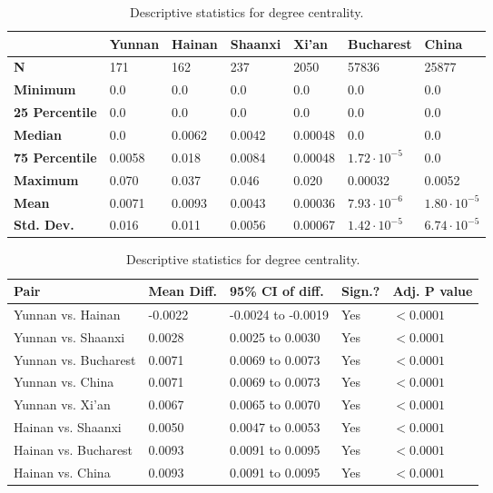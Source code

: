 \begin{table}[h]
	\begin{mdframed}
		\begin{tabular*}{\linewidth}{l|llllll}
			\hline
			\textbf{ } & \textbf{Yunnan} & \textbf{Hainan} & \textbf{Shaanxi} & \textbf{Xi'an} & \textbf{Bucharest} & \textbf{China}\\
			\hline
			\textbf{N} & 171 & 162 & 237 & 2050 & 57836 & 25877\\
			\textbf{Minimum} & 0.0 & 0.0 & 0.0 & 0.0 & 0.0 & 0.0\\
			\textbf{25 Percentile} & 0.0 & 0.0 & 0.0 & 0.0 & 0.0 & 0.0\\
			\textbf{Median} & 0.0 & 0.0062 & 0.0042 & 0.00048 & 0.0 & 0.0\\
			\textbf{75 Percentile} & 0.0058 & 0.018 & 0.0084 & 0.00048 & $1.72\cdot 10^{-5}$ & 0.0\\
			\textbf{Maximum} & 0.070 & 0.037 & 0.046 & 0.020 & 0.00032 & 0.0052\\
			\textbf{Mean} & 0.0071 & 0.0093 & 0.0043 & 0.00036 & $7.93\cdot 10^{-6}$ & $1.80\cdot 10^{-5}$\\
			\textbf{Std. Dev.} & 0.016 & 0.011 & 0.0056 & 0.00067 & $1.42\cdot 10^{-5}$ & $6.74\cdot 10^{-5}$\\
			\hline
		\end{tabular*}
		\caption{Descriptive statistics for degree centrality.}
		\label{tab:degree_centrality_desc}
		\vskip 10pt
		\small
		\begin{tabular*}{\linewidth}{l|llll}
			\hline
			\textbf{Pair} & \textbf{Mean Diff.} & \textbf{95\% CI of diff.} & \textbf{Sign.?} & \textbf{Adj. P value}\\
			\hline
			Yunnan vs. Hainan & -0.0022 & -0.0024 to -0.0019 & Yes & $<0.0001$\\
			Yunnan vs. Shaanxi & 0.0028 & 0.0025 to 0.0030 & Yes & $<0.0001$\\
			Yunnan vs. Bucharest & 0.0071 & 0.0069 to 0.0073 & Yes & $<0.0001$\\
			Yunnan vs. China & 0.0071 & 0.0069 to 0.0073 & Yes & $<0.0001$\\
			Yunnan vs. Xi'an & 0.0067 & 0.0065 to 0.0070 & Yes & $<0.0001$\\
			Hainan vs. Shaanxi & 0.0050 & 0.0047 to 0.0053 & Yes & $<0.0001$\\
			Hainan vs. Bucharest & 0.0093 & 0.0091 to 0.0095 & Yes & $<0.0001$\\
			Hainan vs. China & 0.0093 & 0.0091 to 0.0095 & Yes & $<0.0001$\\

\end{tabular*}
\end{mdframed}
\end{table}
